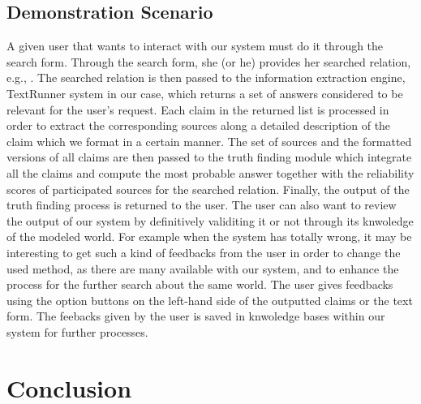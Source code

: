 \documentclass{sig-alternate}
\begin{document}
\subsection{Demonstration Scenario}
A given user that wants to interact with our system
must do it through the search form. Through the search
form, she (or he) provides her searched relation, e.g.,
. The searched relation is then 
passed to the information extraction engine,  TextRunner system
in our case, which returns a set of answers considered to be 
relevant for the user's request. Each claim in the returned list is
processed in order to extract the corresponding sources along a detailed
description of the claim which we format in a certain manner. The 
set of sources and the formatted versions of all claims are then passed
to the truth finding module which integrate all the claims and compute the
most probable answer together with the reliability scores of participated 
sources for the searched relation. Finally, the output of the truth finding
process is returned to the user. The user can also want to review the output
of our system by definitively validiting it or not through its knwoledge of the
modeled world. For example when the system has totally wrong, it may be interesting
to get such a kind of feedbacks from the user in order to change the used method, as
there are many available with our system, and to enhance the process for the further 
search about the same world. The user gives feedbacks using the option buttons on the 
left-hand side of the outputted claims or the text form. The feebacks given by the user
is saved in knwoledge bases within our system for further processes.

\section{Conclusion}
\cite{*}


\end{document}
